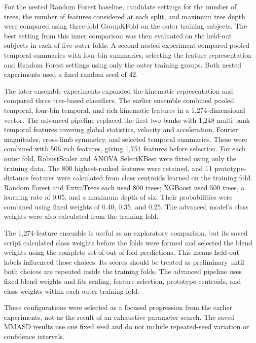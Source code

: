 \documentclass[a4paper,12pt]{report}
\begin{document}
For the nested Random Forest baseline, candidate settings for the number of trees, the number of features considered at each split, and maximum tree depth were compared using three-fold GroupKFold on the outer training subjects. The best setting from this inner comparison was then evaluated on the held-out subjects in each of five outer folds. A second nested experiment compared pooled temporal summaries with four-bin summaries, selecting the feature representation and Random Forest settings using only the outer training groups. Both nested experiments used a fixed random seed of 42.

The later ensemble experiments expanded the kinematic representation and compared three tree-based classifiers. The earlier ensemble combined pooled temporal, four-bin temporal, and rich kinematic features in a 1,274-dimensional vector. The advanced pipeline replaced the first two banks with 1,248 multi-bank temporal features covering global statistics, velocity and acceleration, Fourier magnitudes, cross-limb symmetry, and selected temporal summaries. These were combined with 506 rich features, giving 1,754 features before selection. For each outer fold, RobustScaler and ANOVA SelectKBest were fitted using only the training data. The 800 highest-ranked features were retained, and 11 prototype-distance features were calculated from class centroids learned on the training fold. Random Forest and ExtraTrees each used 800 trees; XGBoost used 500 trees, a learning rate of 0.05, and a maximum depth of six. Their probabilities were combined using fixed weights of 0.40, 0.35, and 0.25. The advanced model's class weights were also calculated from the training fold.

The 1,274-feature ensemble is useful as an exploratory comparison, but its saved script calculated class weights before the folds were formed and selected the blend weights using the complete set of out-of-fold predictions. This means held-out labels influenced those choices. Its scores should be treated as preliminary until both choices are repeated inside the training folds. The advanced pipeline uses fixed blend weights and fits scaling, feature selection, prototype centroids, and class weights within each outer training fold.

These configurations were selected as a focused progression from the earlier experiments, not as the result of an exhaustive parameter search. The saved MMASD results use one fixed seed and do not include repeated-seed variation or confidence intervals.
\end{document}
